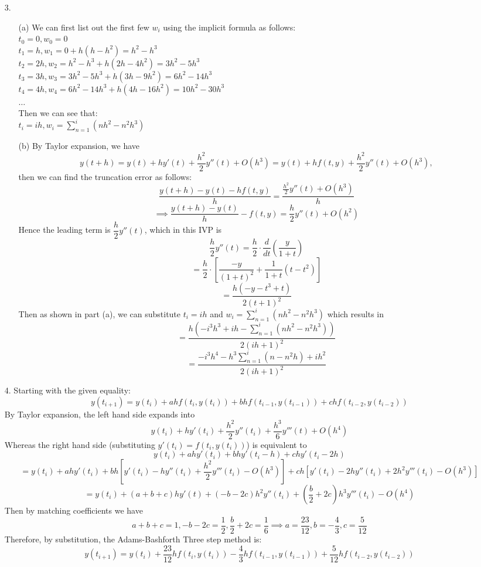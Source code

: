 \documentclass{article}
\begin{document}
\newpage
\begin{itemize}
    \item [3.] \begin{itemize}
        \item [(a)] We can first list out the first few $w_i$ using the implicit formula as follows:\\$t_0=0, w_0=0$\\$t_1=h,w_1=0+h(h-h^2)=h^2-h^3$\\$t_2=2h,w_2=h^2-h^3+h(2h-4h^2)=3h^2-5h^3$\\$t_3=3h,w_3=3h^2-5h^3+h(3h-9h^2)=6h^2-14h^3$\\$t_4=4h,w_4=6h^2-14h^3+h(4h-16h^2)=10h^2-30h^3$\\$\ldots$\\Then we can see that:\\$t_i=ih,w_i=\boxed{\sum_{n=1}^i(nh^2-n^2h^3)}$
        \item [(b)] By Taylor expansion, we have \[y(t+h)=y(t)+hy'(t)+\dfrac{h^2}{2}y''(t)+O(h^3)=y(t)+hf(t,y)+\dfrac{h^2}{2}y''(t)+O(h^3),\] then we can find the truncation error as follows: \[\dfrac{y(t+h)-y(t)-hf(t,y)}{h}=\dfrac{\frac{h^2}{2}y''(t)+O(h^3)}{h}\]\[\implies\dfrac{y(t+h)-y(t)}{h}-f(t,y)=\dfrac{h}{2}y''(t)+O(h^2)\] Hence the leading term is $\dfrac{h}{2}y''(t)$, which in this IVP is \[\dfrac{h}{2}y''(t)=\dfrac{h}{2}\cdot\dfrac{d}{dt}(\dfrac{y}{1+t})\]\[=\dfrac{h}{2}\cdot[\dfrac{-y}{(1+t)^2}+\dfrac{1}{1+t}(t-t^2)]\]\[=\dfrac{h(-y-t^3+t)}{2(t+1)^2}\] Then as shown in part (a), we can substitute $t_i=ih$ and $w_i=\sum_{n=1}^i(nh^2-n^2h^3)$ which results in \[=\dfrac{h(-i^3h^3+ih-\sum_{n=1}^i(nh^2-n^2h^3))}{2(ih+1)^2}\]\[=\boxed{\dfrac{-i^3h^4-h^3\sum_{n=1}^i(n-n^2h)+ih^2}{2(ih+1)^2}}\]
    \end{itemize}
\end{itemize}

\newpage
\begin{itemize}
    \item [4.] Starting with the given equality: \[y(t_{i+1})=y(t_i)+ahf(t_i,y(t_i))+bhf(t_{i-1},y(t_{i-1}))+chf(t_{i-2},y(t_{i-2}))\]By Taylor expansion, the left hand side expands into \[y(t_i)+hy'(t_i)+\dfrac{h^2}{2}y''(t_i)+\dfrac{h^3}{6}y'''(t)+O(h^4)\] Whereas the right hand side (substituting $y'(t_i)=f(t_i,y(t_i))$) is equivalent to \[y(t_i)+ahy'(t_i)+bhy'(t_i-h)+chy'(t_i-2h)\]\[=y(t_i)+ahy'(t_i)+bh[y'(t_i)-hy''(t_i)+\dfrac{h^2}{2}y'''(t_i)-O(h^3)]+ch[y'(t_i)-2hy''(t_i)+2h^2y'''(t_i)-O(h^3)]\]\[=y(t_i)+(a+b+c)hy'(t)+(-b-2c)h^2y''(t_i)+(\frac{b}{2}+2c)h^3y'''(t_i)-O(h^4)\] Then by matching coefficients we have \[a+b+c=1,-b-2c=\dfrac{1}{2},\dfrac{b}{2}+2c=\dfrac{1}{6}\implies a=\dfrac{23}{12},b=-\dfrac{4}{3},c=\dfrac{5}{12}\] Therefore, by substitution, the Adams-Bashforth Three step method is: \[y(t_{i+1})=y(t_i)+\dfrac{23}{12}hf(t_i,y(t_i))-\dfrac{4}{3}hf(t_{i-1},y(t_{i-1}))+\dfrac{5}{12}hf(t_{i-2},y(t_{i-2}))\]
\end{itemize}
\end{document}
